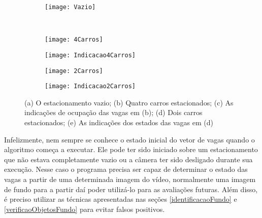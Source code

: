 \begin{figure}
 \centering
\begin{subfigure}{.5\textwidth}
  \centering
  \texttt{[image: Vazio]}
  \caption{}
  \label{ComparacaoFundoVazioFig:sfig1}
\end{subfigure}\

\begin{subfigure}{.5\textwidth}
  \centering
  \texttt{[image: 4Carros]}
  \caption{}
  \label{ComparacaoFundoVazioFig:sfig2}
\end{subfigure}%
\begin{subfigure}{.5\textwidth}
  \centering
  \texttt{[image: Indicacao4Carros]}
  \caption{}
  \label{ComparacaoFundoVazioFig:sfig3}
\end{subfigure}

\begin{subfigure}{.5\textwidth}
  \centering
  \texttt{[image: 2Carros]}
  \caption{}
  \label{ComparacaoFundoVazioFig:sfig4}
\end{subfigure}%
\begin{subfigure}{.5\textwidth}
  \centering
  \texttt{[image: Indicacao2Carros]}
  \caption{}
  \label{ComparacaoFundoVazioFig:sfig5}
\end{subfigure}



\caption{(a) O estacionamento vazio; (b) Quatro carros estacionados; (c) As indicações de ocupação das vagas em (b); (d) Dois carros estacionados; (e) As indicações dos estados das vagas em (d)}
\label{ComparacaoFundoVazioFig}
\end{figure}

Infelizmente, nem sempre se conhece o estado inicial do vetor de vagas quando o algoritmo começa a executar. Ele pode ter sido iniciado sobre um estacionamento que não estava completamente vazio ou a câmera ter sido desligado durante sua execução. Nesse caso o programa precisa ser capaz de determinar o estado das vagas a partir de uma determinada imagem do vídeo, normalmente uma imagem de fundo para a partir daí poder utilizá-lo para as avaliações futuras. Além disso, é preciso utilizar as técnicas apresentadas nas seções \ref{identificacaoFundo} e \ref{verificaoObjetosFundo} para evitar falsos positivos.


